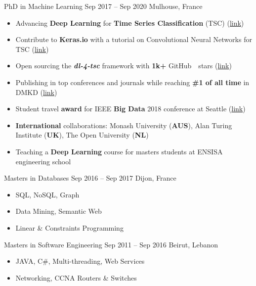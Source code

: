 
 {PhD in Machine Learning} {Sep 2017 -- Sep 2020} {Mulhouse, France} 

\begin{itemize}
    \item Advancing \textbf{Deep Learning} for \textbf{Time Series Classification} (TSC) (\href{https://github.com/hfawaz/}{link})
    \item Contribute to \textbf{Keras.io} with a tutorial on Convolutional Neural Networks for TSC (\href{https://keras.io/examples/timeseries/timeseries_classification_from_scratch/}{link})
    \item Open sourcing the \textbf{\textit{dl-4-tsc}} framework with \textbf{1k+} GitHub~\githubsymbol~stars (\href{https://github.com/hfawaz/dl-4-tsc/}{link})
    \item Publishing in top conferences and journals while reaching \textbf{\#1 of all time} in DMKD (\href{https://scholar.google.com/citations?hl=en&vq=eng_datamininganalysis&view_op=list_hcore&venue=35Y8BTagp0QJ.2022}{link})
    \item Student travel \textbf{award} for IEEE \textbf{Big Data} 2018 conference at Seattle (\href{http://cci.drexel.edu/bigdata/bigdata2018/StudentTravelAward.html}{link})
    \item \textbf{International} collaborations: Monash University (\textbf{AUS}), Alan Turing Institute (\textbf{UK}), The Open University (\textbf{NL})
    \item Teaching a \textbf{Deep Learning} course for masters students at ENSISA engineering school
\end{itemize}

\divider

 {Masters in Databases} {Sep 2016 -- Sep 2017} {Dijon, France} 
\begin{itemize}
    \item SQL, NoSQL, Graph
    \item Data Mining, Semantic Web
    \item Linear \& Constraints Programming
\end{itemize}

\divider

 {Masters in Software Engineering} {Sep 2011 -- Sep 2016} {Beirut, Lebanon} 
\begin{itemize}
    \item JAVA, C\#, Multi-threading, Web Services
    \item Networking, CCNA Routers \& Switches
\end{itemize}

